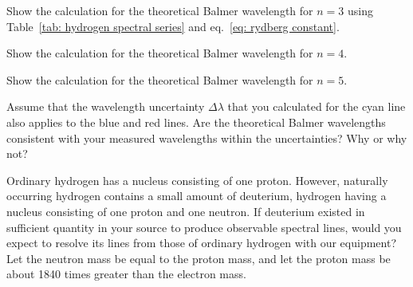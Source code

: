 \documentclass[addpoints]{physlabs}
\begin{document}
\begin{postlab}
\begin{solution}[6cm]
    \end{solution}

    \filbreak
    \question[1] Show the calculation for the theoretical Balmer wavelength for $n=3$ using Table~\ref{tab: hydrogen spectral series} and eq.~\ref{eq: rydberg constant}.
    \begin{solution}[3cm]
        
    \end{solution}

    \filbreak
    \question[1] Show the calculation for the theoretical Balmer wavelength for $n=4$.
    \begin{solution}[3cm]
        
    \end{solution}

    \filbreak
    \question[1] Show the calculation for the theoretical Balmer wavelength for $n=5$.
    \begin{solution}[3cm]
        
    \end{solution}

    \filbreak
    \question[2] Assume that the wavelength uncertainty $\Delta\lambda$ that you calculated for the cyan line also applies to the blue and red lines. Are the theoretical Balmer wavelengths consistent with your measured wavelengths within the uncertainties? Why or why not?
    \begin{solution}[5cm]
        
    \end{solution}

    \filbreak 
    Ordinary hydrogen has a nucleus consisting of one proton. 
    However, naturally occurring hydrogen contains a small amount of deuterium, hydrogen having a nucleus consisting of one proton and one neutron. If deuterium existed in sufficient quantity in your source to produce observable spectral lines, would you expect to resolve its lines from those of ordinary hydrogen with our equipment? Let the neutron mass be equal to the proton mass, and let the proton mass be about 1840 times greater than the electron mass.

    
\end{postlab}
\end{document}
